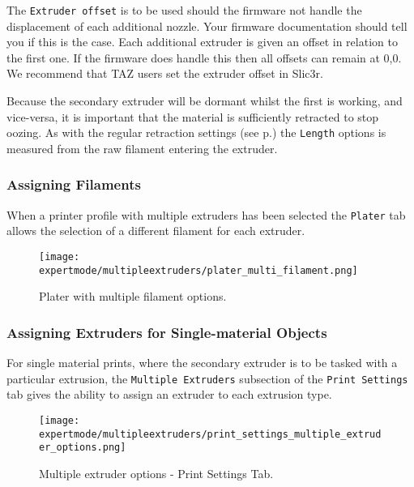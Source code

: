 
The \texttt{Extruder offset} is to be used should the firmware not handle the displacement of each additional nozzle.  Your firmware documentation should tell you if this is the case.  Each additional extruder is given an offset in relation to the first one.  If the firmware does handle this then all offsets can remain at 0,0. We recommend that TAZ users set the extruder offset in Slic3r.

Because the secondary extruder will be dormant whilst the first is working, and vice-versa, it is important that the material is sufficiently retracted to stop oozing.  As with the regular retraction settings (see p.\pageref{fig:retraction_settings}) the \texttt{Length} options is measured from the raw filament entering the extruder.


\subsubsection{Assigning Filaments} %
\label{sub:assigning_filaments}
When a printer profile with multiple extruders has been selected the \texttt{Plater} tab allows the selection of a different filament for each extruder.

\begin{figure}[H]
\centering
\texttt{[image: expertmode/multipleextruders/plater\_multi\_filament.png]}
\caption{Plater with multiple filament options.}
\label{fig:plater_multi_filament}
\end{figure}


\subsubsection{Assigning Extruders for Single-material Objects} %
\label{sub:assigning_extruders}

For single material prints, where the secondary extruder is to be tasked with a particular extrusion, the \texttt{Multiple Extruders} subsection of the \texttt{Print Settings} tab gives the ability to assign an extruder to each extrusion type.

\begin{figure}[H]
\centering
\texttt{[image: expertmode/multipleextruders/print\_settings\_multiple\_extruder\_options.png]}
\caption{Multiple extruder options - Print Settings Tab.}
\label{fig:advanced_multiple_extruder_options}
\end{figure}

